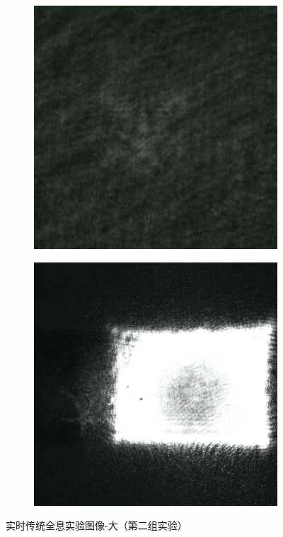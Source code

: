 \documentclass{ctexart}
\begin{document}
\begin{figure}[H]
  \centering
  \begin{subfigure}{.48\textwidth}
    \includegraphics[width=\linewidth]{数字全息实验数据/数字全息/大2/大2.jpg}
  \end{subfigure}
  \begin{subfigure}{.48\textwidth}
    \includegraphics[width=\linewidth]{数字全息实验数据/实时传统全息/大2结果.jpg}
  \end{subfigure}
  \caption{实时传统全息实验图像-大（第二组实验）}
\end{figure}
\end{document}
